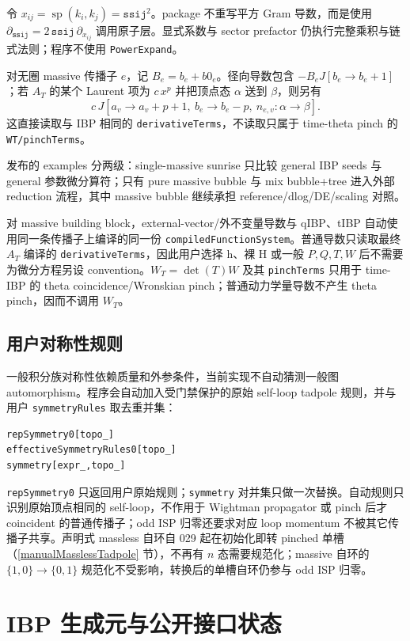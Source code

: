 ﻿\documentclass[a4paper,11pt]{article}
\begin{document}
令 $x_{ij}=\operatorname{sp}(k_i,k_j)=\texttt{ssij}^2$。package 不重写平方 Gram 导数，而是使用 $\partial_{\texttt{ssij}}=2\,\texttt{ssij}\,\partial_{x_{ij}}$ 调用原子层。显式系数与 sector prefactor 仍执行完整乘积与链式法则；程序不使用 \texttt{PowerExpand}。

对无圈 massive 传播子 $e$，记 $B_e=b_e+b0_e$。径向导数包含 $-B_eJ[b_e\to b_e+1]$；若 $A_T$ 的某个 Laurent 项为 $c\,x^p$ 并把顶点态 $\alpha$ 送到 $\beta$，则另有
\begin{equation}
 c\,J[a_v\to a_v+p+1,\ b_e\to b_e-p,\ n_{e,v}:\alpha\to\beta].
\end{equation}
这直接读取与 IBP 相同的 \texttt{derivativeTerms}，不读取只属于 time-theta pinch 的 \texttt{WT/pinchTerms}。

发布的 examples 分两级：single-massive sunrise 只比较 general IBP seeds 与 general 参数微分算符；只有 pure massive bubble 与 mix bubble+tree 进入外部 reduction 流程，其中 massive bubble 继续承担 reference/dlog/DE/scaling 对照。

对 massive building block，external-vector/外不变量导数与 qIBP、tIBP 自动使用同一条传播子上编译的同一份 \texttt{compiledFunctionSystem}。普通导数只读取最终 $A_T$ 编译的 \texttt{derivativeTerms}，因此用户选择 h、裸 H 或一般 $P,Q,T,W$ 后不需要为微分方程另设 convention。$W_T=\det(T)W$ 及其 \texttt{pinchTerms} 只用于 time-IBP 的 theta coincidence/Wronskian pinch；普通动力学量导数不产生 theta pinch，因而不调用 $W_T$。

\subsection{用户对称性规则}

一般积分族对称性依赖质量和外参条件，当前实现不自动猜测一般图 automorphism。程序会自动加入受门禁保护的原始 self-loop tadpole 规则，并与用户 \texttt{symmetryRules} 取去重并集：
\begin{verbatim}
repSymmetry0[topo_]
effectiveSymmetryRules0[topo_]
symmetry[expr_,topo_]
\end{verbatim}
\texttt{repSymmetry0} 只返回用户原始规则；\texttt{symmetry} 对并集只做一次替换。自动规则只识别原始顶点相同的 self-loop，不作用于 Wightman propagator 或 pinch 后才 coincident 的普通传播子；odd ISP 归零还要求对应 loop momentum 不被其它传播子共享。声明式 massless 自环自 029 起在初始化即转 pinched 单槽（\ref{manualMasslessTadpole} 节），不再有 $n$ 态需要规范化；massive 自环的 $\{1,0\}\to\{0,1\}$ 规范化不受影响，转换后的单槽自环仍参与 odd ISP 归零。

\section{IBP 生成元与公开接口状态}
\end{document}
